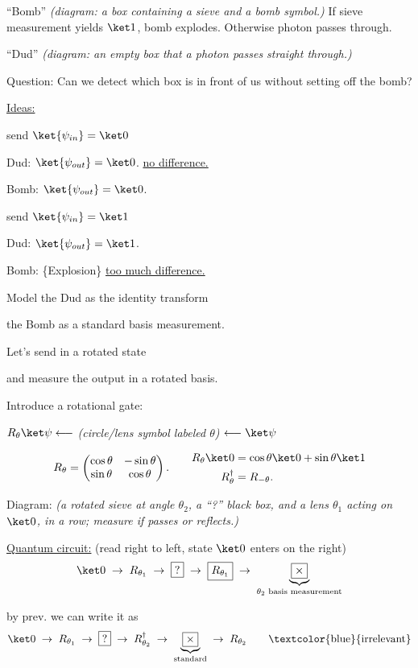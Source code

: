 \documentclass[11pt]{article}
\begin{document}
``Bomb'' \quad \emph{(diagram: a box containing a sieve and a bomb symbol.)} If sieve measurement yields $\ket1$, bomb explodes. Otherwise photon passes through.

``Dud'' \quad \emph{(diagram: an empty box that a photon passes straight through.)}

Question: Can we detect which box is in front of us without setting off the bomb?

\underline{Ideas:}

send $\ket{\psi_{in}} = \ket0$

Dud: $\ket{\psi_{out}} = \ket0$. \hfill \underline{no difference.}

Bomb: $\ket{\psi_{out}} = \ket0$.

send $\ket{\psi_{in}} = \ket1$

Dud: $\ket{\psi_{out}} = \ket1$.

Bomb: \{Explosion\} \hfill \underline{too much difference.}

Model the Dud as the identity transform

the Bomb as a standard basis measurement.

Let's send in a rotated state

and measure the output in a rotated basis.

Introduce a rotational gate:

$R_\theta\ket\psi \longleftarrow$ \emph{(circle/lens symbol labeled $\theta$)} $\longleftarrow \ket\psi$

\[
R_\theta = \begin{pmatrix} \cos\theta & -\sin\theta \\ \sin\theta & \cos\theta \end{pmatrix}. \qquad
\begin{aligned} R_\theta\ket0 &= \cos\theta\ket0 + \sin\theta\ket1 \\ R_\theta^\dagger &= R_{-\theta}. \end{aligned}
\]

Diagram: \emph{(a rotated sieve at angle $\theta_2$, a ``?'' black box, and a lens $\theta_1$ acting on $\ket0$, in a row; measure if passes or reflects.)}

\underline{Quantum circuit:} (read right to left, state $\ket0$ enters on the right)
\[
\ket0 \;\to\; R_{\theta_1} \;\to\; \fbox{?} \;\to\; \fbox{$R_{\theta_1}$} \;\to\; \underbrace{\fbox{$\times$}}_{\theta_2 \text{ basis measurement}}
\]

by prev. we can write it as
\[
\ket0 \;\to\; R_{\theta_1} \;\to\; \fbox{?} \;\to\; R_{\theta_2}^\dagger \;\to\; \underbrace{\fbox{$\times$}}_{\text{standard}} \;\to\; R_{\theta_2} \qquad \text{\textcolor{blue}{irrelevant}}
\]
\end{document}
